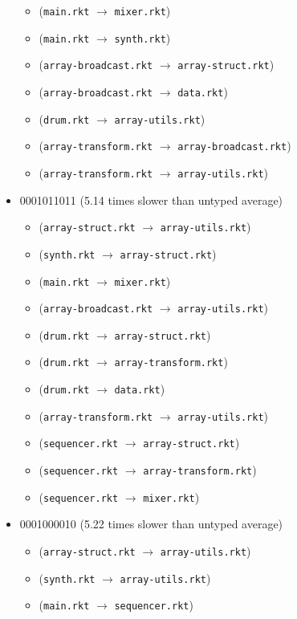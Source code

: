 \documentclass{article}
\newcommand{\mono}[1]{\texttt{#1}}
\begin{document}
\begin{itemize}
\begin{itemize}
  \item (\mono{main.rkt} $\rightarrow$ \mono{mixer.rkt})
  \item (\mono{main.rkt} $\rightarrow$ \mono{synth.rkt})
  \item (\mono{array-broadcast.rkt} $\rightarrow$ \mono{array-struct.rkt})
  \item (\mono{array-broadcast.rkt} $\rightarrow$ \mono{data.rkt})
  \item (\mono{drum.rkt} $\rightarrow$ \mono{array-utils.rkt})
  \item (\mono{array-transform.rkt} $\rightarrow$ \mono{array-broadcast.rkt})
  \item (\mono{array-transform.rkt} $\rightarrow$ \mono{array-utils.rkt})
  \end{itemize}
\item 0001011011 (5.14 times slower than untyped average)
  \begin{itemize}
  \item (\mono{array-struct.rkt} $\rightarrow$ \mono{array-utils.rkt})
  \item (\mono{synth.rkt} $\rightarrow$ \mono{array-struct.rkt})
  \item (\mono{main.rkt} $\rightarrow$ \mono{mixer.rkt})
  \item (\mono{array-broadcast.rkt} $\rightarrow$ \mono{array-utils.rkt})
  \item (\mono{drum.rkt} $\rightarrow$ \mono{array-struct.rkt})
  \item (\mono{drum.rkt} $\rightarrow$ \mono{array-transform.rkt})
  \item (\mono{drum.rkt} $\rightarrow$ \mono{data.rkt})
  \item (\mono{array-transform.rkt} $\rightarrow$ \mono{array-utils.rkt})
  \item (\mono{sequencer.rkt} $\rightarrow$ \mono{array-struct.rkt})
  \item (\mono{sequencer.rkt} $\rightarrow$ \mono{array-transform.rkt})
  \item (\mono{sequencer.rkt} $\rightarrow$ \mono{mixer.rkt})
  \end{itemize}
\item 0001000010 (5.22 times slower than untyped average)
  \begin{itemize}
  \item (\mono{array-struct.rkt} $\rightarrow$ \mono{array-utils.rkt})
  \item (\mono{synth.rkt} $\rightarrow$ \mono{array-utils.rkt})
  \item (\mono{main.rkt} $\rightarrow$ \mono{sequencer.rkt})

\end{itemize}
\end{itemize}
\end{document}
